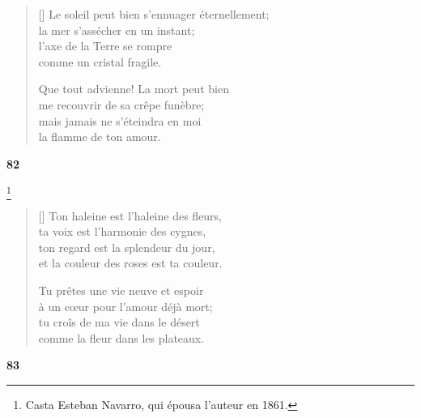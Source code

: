 \documentclass[a4paper,12pt]{book}
\begin{document}
\settowidth{\versewidth}{Le soleil peut bien s'ennuager éternellement;}


\begin{verse}[\versewidth]
  Le soleil peut bien s'ennuager éternellement; \\
  la mer s'assécher en un instant; \\
  l'axe de la Terre se rompre \\
  comme un cristal fragile.

  Que tout advienne! La mort peut bien \\
  me recouvrir de sa crêpe funèbre; \\
  mais jamais ne s'éteindra en moi \\
  la flamme de ton amour.
\end{verse}

\bigskip

\begin{center}
  \textbf{82}
\end{center}

\settowidth{\versewidth}{et la couleur des roses est ta couleur.}

\footnote{Casta Esteban Navarro, qui épousa
  l'auteur en 1861.}

\begin{verse}[\versewidth]
  Ton haleine est l'haleine des fleurs, \\
  ta voix est l'harmonie des cygnes, \\
  ton regard est la splendeur du jour, \\
  et la couleur des roses est ta couleur.

  Tu prêtes une vie neuve et espoir \\
  à un cœur pour l'amour déjà mort; \\
  tu croîs de ma vie dans le désert \\
  comme la fleur dans les plateaux.
\end{verse}

\bigskip

\begin{center}
  \textbf{83}
\end{center}

\settowidth{\versewidth}{Il lui donne son mystère et sa poésie,}
\end{document}
